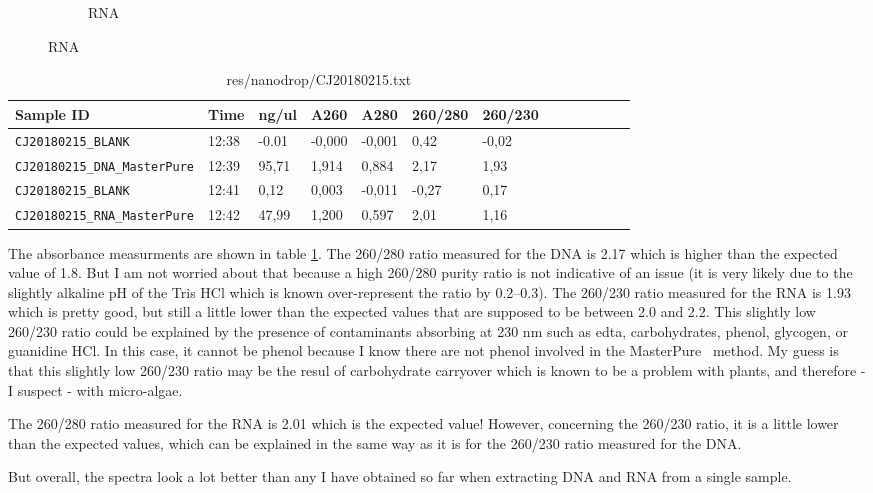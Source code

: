 \begin{figure}[H]
\begin{subfigure}[b]{0.49\textwidth}
        \caption{RNA}
        \label{sfig:CJ20180215_RNA_MasterPure}
    \end{subfigure}
\end{figure}


\begin{table}[htbp]
\caption{res/nanodrop/CJ20180215.txt}
\label{tab:CJ20180215}
\centering
\begin{tabular}{l l l l l l l l l l l l l }
\toprule
Sample ID & Time  & ng/ul  & A260  & A280  & 260/280  & 260/230  \\ \midrule
\texttt{CJ20180215\_BLANK} & 12:38 & -0.01 & -0,000 & -0,001 & 0,42 & -0,02 \\
\texttt{CJ20180215\_DNA\_MasterPure} & 12:39 & 95,71 & 1,914 & 0,884 & 2,17 & 1,93 \\
\texttt{CJ20180215\_BLANK} & 12:41 & 0,12 & 0,003 & -0,011 & -0,27 & 0,17 \\
\texttt{CJ20180215\_RNA\_MasterPure} & 12:42 & 47,99 & 1,200 & 0,597 & 2,01 & 1,16 \\
\bottomrule
\end{tabular}
\end{table}

The absorbance measurments are shown in table \ref{tab:CJ20180215}. The 260/280 ratio measured for the DNA is 2.17 which is higher than the expected value of 1.8. But I am not worried about that because a high 260/280 purity ratio is not indicative of an issue (it is very likely due to the slightly alkaline pH of the Tris HCl which is known over-represent the ratio by 0.2–0.3). The 260/230 ratio measured for the RNA is 1.93 which is pretty good, but still a little lower than the expected values that are supposed to be between 2.0 and 2.2. This slightly low 260/230 ratio could be explained by the presence of contaminants absorbing at 230 nm such as \gls{edta}, carbohydrates, phenol, glycogen, or guanidine HCl. In this case, it cannot be phenol because I know there are not phenol involved in the MasterPure\texttrademark~ method. My guess is that this slightly low 260/230 ratio may be the resul of carbohydrate carryover which is known to be a problem with plants, and therefore - I suspect - with micro-algae.

The 260/280 ratio measured for the RNA is 2.01 which is the expected value! However, concerning the 260/230 ratio, it is a little lower than the expected values, which can be explained in the same way as it is for the 260/230 ratio measured for the DNA.

But overall, the spectra look a lot better than any I have obtained so far when extracting DNA and RNA from a single sample.